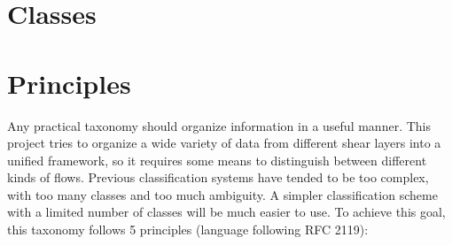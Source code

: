 %

\section{Classes}

\section{Principles}

Any practical taxonomy should organize information in a useful manner.  This
project tries to organize a wide variety of data from different shear layers
into a unified framework, so it requires some means to distinguish between
different kinds of flows.  Previous classification systems have tended to be
too complex, with too many classes and too much ambiguity.  A simpler
classification scheme with a limited number of classes will be much easier to
use.  To achieve this goal, this taxonomy follows 5 principles (language
following RFC 2119):

